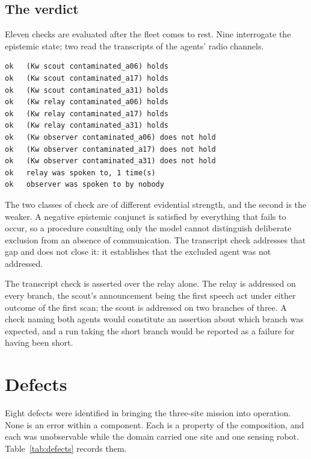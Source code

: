 \documentclass[11pt,a4paper]{article}
\theoremstyle{definition}
\begin{document}
\subsection{The verdict}
\label{sec:verdict}

Eleven checks are evaluated after the fleet comes to rest. Nine interrogate the
epistemic state; two read the transcripts of the agents' radio channels.

\begin{lstlisting}
ok   (Kw scout contaminated_a06) holds
ok   (Kw scout contaminated_a17) holds
ok   (Kw scout contaminated_a31) holds
ok   (Kw relay contaminated_a06) holds
ok   (Kw relay contaminated_a17) holds
ok   (Kw relay contaminated_a31) holds
ok   (Kw observer contaminated_a06) does not hold
ok   (Kw observer contaminated_a17) does not hold
ok   (Kw observer contaminated_a31) does not hold
ok   relay was spoken to, 1 time(s)
ok   observer was spoken to by nobody
\end{lstlisting}

The two classes of check are of different evidential strength, and the second
is the weaker. A negative epistemic conjunct is satisfied by everything that
fails to occur, so a procedure consulting only the model cannot distinguish
deliberate exclusion from an absence of communication. The transcript check
addresses that gap and does not close it: it establishes that the excluded
agent was not addressed.

The transcript check is asserted over the relay alone. The relay is addressed
on every branch, the scout's announcement being the first speech act under
either outcome of the first scan; the scout is addressed on two branches of
three. A check naming both agents would constitute an assertion about which
branch was expected, and a run taking the short branch would be reported as a
failure for having been short.

\section{Defects}
\label{sec:defects}

Eight defects were identified in bringing the three-site mission into
operation. None is an error within a component. Each is a property of the
composition, and each was unobservable while the domain carried one site and
one sensing robot. Table~\ref{tab:defects} records them.
\end{document}
